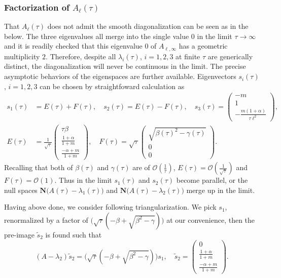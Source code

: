 \documentclass[a4paper,11pt]{article}
\def\l{{\ell}}
\theoremstyle{remark}
\begin{document}
{\subsubsection{Factorization of $A_\ell(\tau)$}
That $A_\ell(\tau)$ does not admit the smooth diagonalization can be seen as in the below. The three eigenvalues all merge into the single value $0$ in the limit $\tau \rightarrow \infty$ and it is readily checked that this eigenvalue $0$ of $A_{\ell,\infty}$ has a geometric multiplicity $2$. Therefore, despite all $\lambda_i(\tau)$, $i=1,2,3$ at finite $\tau$ are generically distinct, the diagonalization will never be continuous in the limit.
The precise asymptotic behaviors of the eigenspaces are further available. %
Eigenvectors $s_i(\tau)$, $i=1,2,3$ can be chosen by straightfoward calculation as
\begin{align*}
 s_1(\tau)&=E(\tau) + F(\tau), \quad s_2(\tau)=E(\tau)-F(\tau), \quad s_3(\tau) = \begin{pmatrix} -m\\1\\ -\frac{m(1+\alpha)}{\tau\l^2} \end{pmatrix},\\
 E(\tau) &= \frac{1}{\sqrt{\tau}} \begin{pmatrix} \tau\beta \\ \frac{1+\alpha}{1+m} \\ \frac{-\alpha+m}{1+m} \end{pmatrix}, \quad  F(\tau)= \sqrt{\tau}\begin{pmatrix}  \sqrt{\beta(\tau)^2-\gamma(\tau)}\\0\\0 \end{pmatrix}.
\end{align*}
Recalling that both of $\beta(\tau)$ and $\gamma(\tau)$ are of $\mathcal{O}(\frac{1}{\tau})$, $E(\tau)=\mathcal{O}(\frac{1}{\sqrt{\tau}})$ and $F(\tau)=\mathcal{O}(1)$. Thus in the limit $s_1(\tau)$ and $s_2(\tau)$ become parallel, or the null spaces $\mathbf{N}\Big(A(\tau) - \lambda_1(\tau)\Big)$ and $\mathbf{N}\Big(A(\tau) - \lambda_2(\tau)\Big)$ merge up in the limit.

Having above done, we consider following triangularization. We pick $s_1$, renormalized by a factor of $\Big(\sqrt{\tau}(-\beta+\sqrt{\beta^2-\gamma})\Big)$ at our convenience, then the pre-image $\tilde s_2$ is found such that
$$ (A-\lambda_2) \tilde s_2 = \Big(\sqrt{\tau}(-\beta+\sqrt{\beta^2-\gamma})\Big)s_1, \quad \text{$\tilde s_2 = \begin{pmatrix}  0 \\ \tfrac{1+\alpha}{1+m} \\ \tfrac{-\alpha+m}{1+m} \end{pmatrix}$}.$$

}
\end{document}
